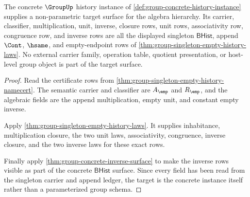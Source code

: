 \begin{theorem}
\label{thm:group-concrete-instance-schema-unlock}
The concrete $\GroupUp$ history instance of
\autoref{def:group-concrete-history-instance} supplies a non-parametric target
surface for the algebra hierarchy. Its carrier, classifier, multiplication,
unit, inverse, closure rows, unit rows, associativity row, congruence row, and
inverse rows are all the displayed singleton $\mathsf{BHist}$, append
$\Cont$, $\hsame$, and empty-endpoint rows of
\autoref{thm:group-singleton-empty-history-laws}. No external carrier family,
operation table, quotient presentation, or host-level group object is part of
the target surface.
\end{theorem}
\begin{proof}
Read the certificate rows from
\autoref{thm:group-singleton-empty-history-namecert}. The semantic carrier and
classifier are $A_{\emp}$ and $R_{\emp}$, and the algebraic fields are the
append multiplication, empty unit, and constant empty inverse.

Apply \autoref{thm:group-singleton-empty-history-laws}. It supplies
inhabitance, multiplication closure, the two unit laws, associativity,
congruence, inverse closure, and the two inverse laws for these exact rows.

Finally apply \autoref{thm:group-concrete-inverse-surface} to make the inverse
rows visible as part of the concrete $\mathsf{BHist}$ surface. Since every
field has been read from the singleton carrier and append ledger, the target
is the concrete instance itself rather than a parameterized group schema.
\end{proof}

